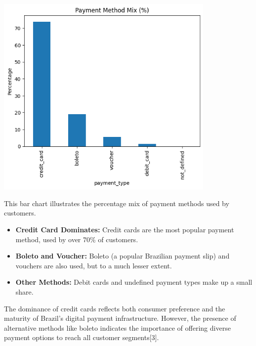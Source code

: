 \documentclass[a4paper]{article}
\begin{document}
\begin{multicols}{2}
\vspace{1em}

\noindent
\begin{minipage}{\columnwidth}
\centering
\includegraphics[width=0.8\textwidth]{Payment Method Mix.png}
\label{fig:payment_method_mix}
\end{minipage}

This bar chart illustrates the percentage mix of payment methods used by customers.

\begin{itemize}
    \item \textbf{Credit Card Dominates:} Credit cards are the most popular payment method, used by over 70\% of customers.
    \item \textbf{Boleto and Voucher:} Boleto (a popular Brazilian payment slip) and vouchers are also used, but to a much lesser extent.
    \item \textbf{Other Methods:} Debit cards and undefined payment types make up a small share.
\end{itemize}

The dominance of credit cards reflects both consumer preference and the maturity of Brazil’s digital payment infrastructure. However, the presence of alternative methods like boleto indicates the importance of offering diverse payment options to reach all customer segments[3].

\vspace{1em}


\end{multicols}
\end{document}
